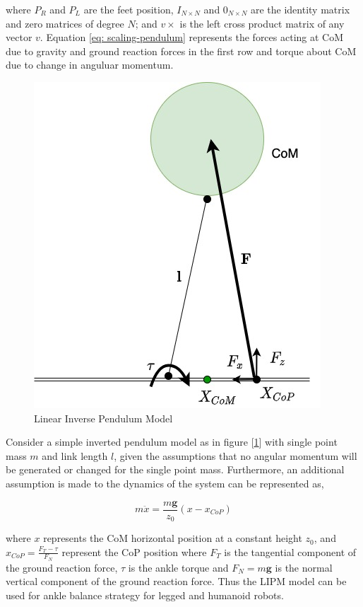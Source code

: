 where $P_R$ and $P_L$ are the feet position, $I_{N \times N}$ and $0_{N \times N}$ are the identity matrix and zero matrices of degree $N$; and $v\times$ is the left cross product matrix of any vector $v$. Equation \ref{eq: scaling-pendulum} 
represents the forces acting at CoM due to gravity and ground reaction forces in the first row and torque about CoM due to change in anguluar momentum.


\begin{figure}[h!]
    \centering
    \includegraphics[scale=.5]{images/LIP.jpg}\hfill
    \caption{Linear Inverse Pendulum Model}\hfill
    \label{ipm}
\end{figure}

Consider a simple inverted pendulum model as in figure [\ref{ipm}] with single point mass $m$ and link length $l$, given the assumptions that no angular momentum will be generated or changed for the single point mass. Furthermore, an additional assumption
is made to the dynamics of the system can be represented 
as,

\begin{equation}
    \label{eq: CoP}
    m\ddot{x} = \frac{m\mathbf{g}}{z_0}(x - x_{CoP})
\end{equation}

where $x$ represents the CoM horizontal position at a constant height $z_0$, and $x_{CoP} = \frac{F_T - \tau}{F_N}$ represent the CoP position where $F_T$ is the tangential component of the ground reaction force, $\tau$ is the ankle torque and $F_N = m\mathbf{g}$ is the normal
vertical component of the ground reaction force. Thus the LIPM model can be used for ankle balance strategy for legged and humanoid robots.

